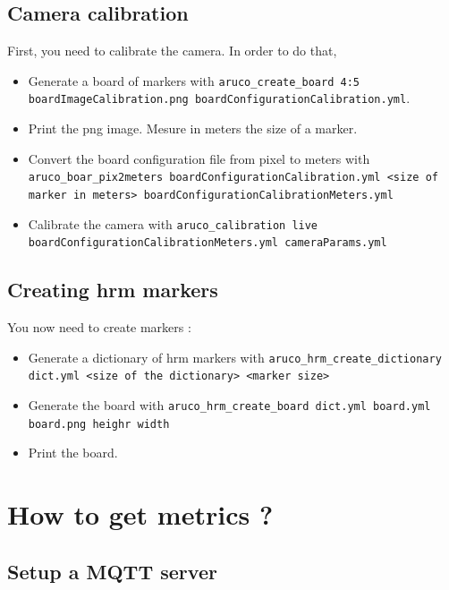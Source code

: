 \documentclass[a4paper,11pt]{report}
\begin{document}
\subsection{Camera calibration}

First, you need to calibrate the camera. In order to do that, \begin{itemize}

    \item Generate a board of markers with \texttt{aruco\_create\_board 4:5
        boardImageCalibration.png boardConfigurationCalibration.yml}.

    \item Print the png image. Mesure in meters the size of a marker.

    \item Convert the board configuration file from pixel to meters with
        \texttt{aruco\_boar\_pix2meters boardConfigurationCalibration.yml <size
        of marker in meters> boardConfigurationCalibrationMeters.yml}

    \item Calibrate the camera with \texttt{aruco\_calibration live
        boardConfigurationCalibrationMeters.yml cameraParams.yml}

\end{itemize}

\subsection{Creating hrm markers}

You now need to create markers : \begin{itemize}

    \item Generate a dictionary of hrm markers with
        \texttt{aruco\_hrm\_create\_dictionary dict.yml <size of the
        dictionary> <marker size>}

    \item Generate the board with \texttt{aruco\_hrm\_create\_board dict.yml
        board.yml board.png heighr width}

    \item Print the board.

\end{itemize}



\section{How to get metrics ?} \subsection{Setup a MQTT server}
\end{document}
